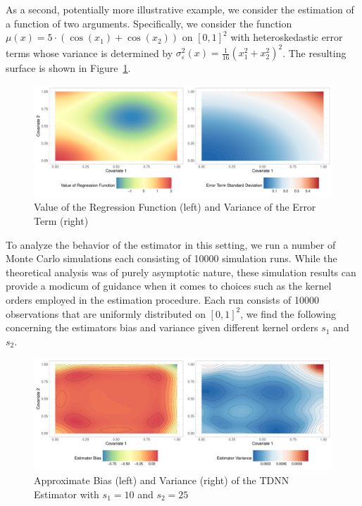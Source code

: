 \newpage
As a second, potentially more illustrative example, we consider the estimation of a function of two arguments.
Specifically, we consider the function $\mu(x) = 5 \cdot \left(\cos(x_1) + \cos(x_2)\right)$ on $[0,1]^2$ with heteroskedastic error terms whose variance is determined by $\sigma_{\varepsilon}^2(x) = \frac{1}{16}\left(x_1^2 + x_2^2\right)^2$.
The resulting surface is shown in Figure~\ref{fig:reg_surface}.

\begin{figure}[H]
	\centering
	\includegraphics[width = \textwidth]{../Graphics/Reg_Exmp1.pdf}
	\caption{Value of the Regression Function (left) and Variance of the Error Term (right)}
	\label{fig:reg_surface}
\end{figure}
To analyze the behavior of the estimator in this setting, we run a number of Monte Carlo simulations each consisting of 10000 simulation runs.
While the theoretical analysis was of purely asymptotic nature, these simulation results can provide a modicum of guidance when it comes to choices such as the kernel orders employed in the estimation procedure.
Each run consists of 10000 observations that are uniformly distributed on ${[0,1]}^2$, we find the following concerning the estimators bias and variance given different kernel orders $s_1$ and $s_2$.
\begin{figure}[H]
	\centering
	\includegraphics[width = \textwidth]{../Code/Simulations/Graphics/Reg_Exp1/TDNN/Plot_TDNN_n10000s_10_25.RDS.pdf}
	\caption{Approximate Bias (left) and Variance (right) of the TDNN Estimator with $s_1 = 10$ and $s_2 = 25$}
	\label{fig:est_bias_var_2}
\end{figure}
